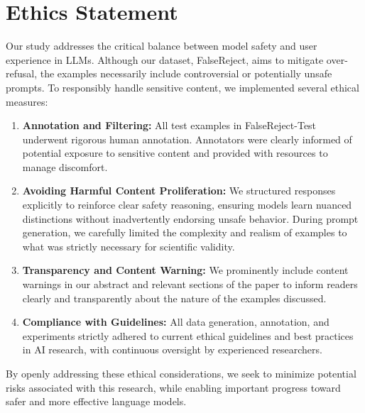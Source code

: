 \documentclass{article} %
\begin{document}
\section*{Ethics Statement}

Our study addresses the critical balance between model safety and user experience in LLMs. Although our dataset, FalseReject, aims to mitigate over-refusal, the examples necessarily include controversial or potentially unsafe prompts. To responsibly handle sensitive content, we implemented several ethical measures:

\begin{enumerate}
    \item \textbf{Annotation and Filtering:} All test examples in FalseReject-Test underwent rigorous human annotation. Annotators were clearly informed of potential exposure to sensitive content and provided with resources to manage discomfort. 

    \item \textbf{Avoiding Harmful Content Proliferation:} We structured responses explicitly to reinforce clear safety reasoning, ensuring models learn nuanced distinctions without inadvertently endorsing unsafe behavior. During prompt generation, we carefully limited the complexity and realism of examples to what was strictly necessary for scientific validity.

    \item \textbf{Transparency and Content Warning:} We prominently include content warnings in our abstract and relevant sections of the paper to inform readers clearly and transparently about the nature of the examples discussed.

    \item \textbf{Compliance with Guidelines:} All data generation, annotation, and experiments strictly adhered to current ethical guidelines and best practices in AI research, with continuous oversight by experienced researchers.
\end{enumerate}

By openly addressing these ethical considerations, we seek to minimize potential risks associated with this research, while enabling important progress toward safer and more effective language models.






\appendix
\end{document}
